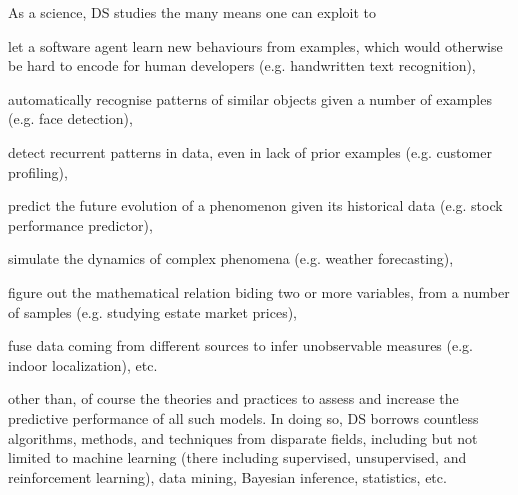 \documentclass[12pt,a4paper,openright,twoside]{book}
\begin{document}
As a science, DS studies the many means one can exploit to %
%
\begin{inlinelist}
    \item let a software agent learn new behaviours from examples, which would otherwise be hard to encode for human developers (e.g. handwritten text recognition),
    \item automatically recognise patterns of similar objects given a number of examples (e.g. face detection),
    \item detect recurrent patterns in data, even in lack of prior examples (e.g. customer profiling),
    \item predict the future evolution of a phenomenon given its historical data (e.g. stock performance predictor),
    \item simulate the dynamics of complex phenomena (e.g. weather forecasting),
    \item figure out the mathematical relation biding two or more variables, from a number of samples (e.g. studying estate market prices),
    \item fuse data coming from different sources to infer unobservable measures (e.g. indoor localization), etc.
\end{inlinelist}
%
other than, of course the theories and practices to assess and increase the predictive performance of all such models.
%
In doing so, DS borrows countless algorithms, methods, and techniques from disparate fields, including but not limited to machine learning (there including supervised, unsupervised, and reinforcement learning), data mining, Bayesian inference, statistics, etc.
\end{document}

